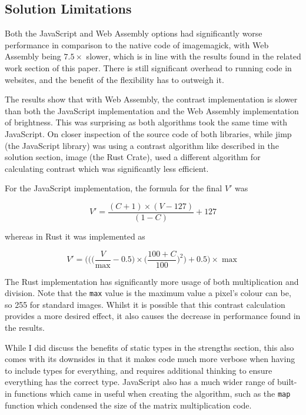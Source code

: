 \documentclass[12pt,a4paper]{article}
\begin{document}
\subsection{Solution Limitations}

Both the JavaScript and Web Assembly options had significantly worse performance in comparison to the native code of imagemagick, with Web Assembly being $7.5 \times$ slower, which is in line with the results found in the related work section of this paper. There is still significant overhead to running code in websites, and the benefit of the flexibility has to outweigh it.


The results show that with Web Assembly, the contrast implementation is slower than both the JavaScript implementation and the Web Assembly implementation of brightness. This was surprising as both algorithms took the same time with JavaScript. On closer inspection of the source code of both libraries, while jimp (the JavaScript library) was using a contrast algorithm like described in the solution section, image (the Rust Crate), used a different algorithm for calculating contrast which was significantly less efficient.

For the JavaScript implementation, the formula for the final $V'$ was

$$
    V'=\frac{(C+1)\times (V-127)}{(1-C)}+127
$$

whereas in Rust it was implemented as

$$
    V'=\bigg(\bigg(\bigg(\frac{V}{\max}-0.5)\times\bigg(\frac{100+C}{100}\bigg)^2\bigg)+0.5\bigg)\times \max
$$

The Rust implementation has significantly more usage of both multiplication and division. Note that the \texttt{max} value is the maximum value a pixel's colour can be, so 255 for standard images. Whilst it is possible that this contrast calculation provides a more desired effect, it also causes the decrease in performance found in the results.

While I did discuss the benefits of static types in the strengths section, this also comes with its downsides in that it makes code much more verbose when having to include types for everything, and requires additional thinking to ensure everything has the correct type. JavaScript also has a much wider range of built-in functions which came in useful when creating the algorithm, such as the \texttt{map} function which condensed the size of the matrix multiplication code.
\end{document}
